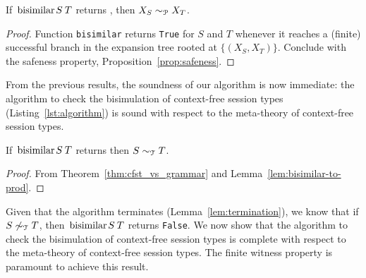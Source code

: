 \begin{lemma}
  \label{lem:bisimilar-to-prod}
  If $\bisimf S T$ returns , then
  $X_{S} \sim_\mathcal P X_{T}$.
\end{lemma}

\begin{proof}
  Function \lstinline|bisimilar| returns \lstinline|True| for $S$ and
  $T$ whenever it reaches a (finite) successful branch in the expansion
  tree rooted at $\{(X_{S}, X_{T})\}$. Conclude with the safeness property,
  Proposition~\ref{prop:safeness}.
\end{proof}

From the previous results, the soundness of our algorithm is now
immediate: the algorithm to check the bisimulation of context-free
session types (Listing~\ref{lst:algorithm}) is sound with respect to
the meta-theory of context-free session types.

\begin{theorem}[Soundness]
\label{thm:soundness}
  If $\bisimf ST$ returns  then $S\sim_\mathcal T T$.
\end{theorem}
%
\begin{proof}
  From Theorem~\ref{thm:cfst_vs_grammar} and
  Lemma~\ref{lem:bisimilar-to-prod}.
\end{proof}

 
Given that the algorithm terminates (Lemma~\ref{lem:termination}), we
know that if $S\not\sim_\mathcal T T$, then $\bisimf ST$ returns
\lstinline|False|.
%
We now show that the algorithm to check the bisimulation of context-free session 
types is complete with respect to the meta-theory of context-free session
types. The finite witness property is paramount to achieve this result.

